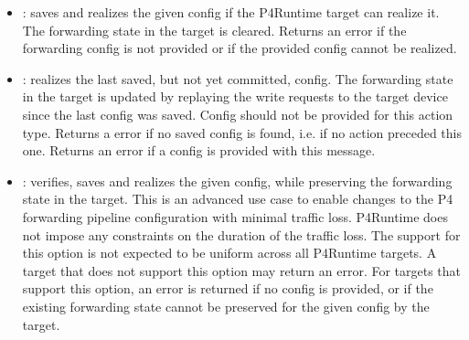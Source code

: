 \documentclass[11pt]{article}
\begin{document}
{\begin{itemize}
\item{}
: saves and realizes the given config if the P4Runtime
target can realize it. The forwarding state in the target is cleared. Returns
an  error if the forwarding config is not provided or if the
provided config cannot be realized.%

\item{}
: realizes the last saved, but not yet committed, config. The
forwarding state in the target is updated by replaying the write requests to
the target device since the last config was saved. Config should not be
provided for this action type. Returns a  error if no saved config
is found, i.e. if no  action preceded this one. Returns an
 error if a config is provided with this message.%

\item{}
: verifies, saves and realizes the given config, while
preserving the forwarding state in the target. This is an advanced use case to
enable changes to the P4 forwarding pipeline configuration with minimal
traffic loss. P4Runtime does not impose any constraints on the duration of the
traffic loss. The support for this option is not expected to be uniform across
all P4Runtime targets. A target that does not support this option may return
an  error. For targets that support this option, an
 error is returned if no config is provided, or if the
existing forwarding state cannot be preserved for the given config by the
target.%
\end{itemize}%

}
\end{document}
